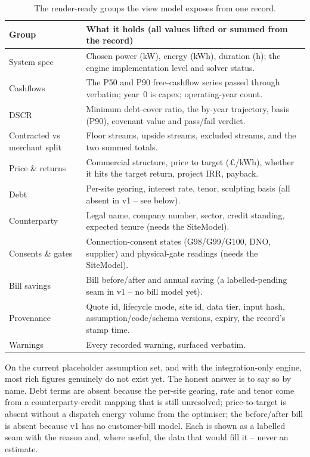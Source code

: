 \begin{table}[H]
\centering
\caption{The render-ready groups the view model exposes from one record.}
\label{tab:vm-fields}
\small\sffamily
\begin{tabularx}{\textwidth}{@{}l L@{}}
\toprule
\textbf{Group} & \textbf{What it holds (all values lifted or summed from the record)} \\
\midrule
System spec & Chosen power (kW), energy (kWh), duration (h); the engine implementation level and solver status. \\
Cashflows & The P50 and P90 free-cashflow series passed through verbatim; year~0 is capex; operating-year count. \\
DSCR & Minimum debt-cover ratio, the by-year trajectory, basis (P90), covenant value and pass/fail verdict. \\
Contracted vs merchant split & Floor streams, upside streams, excluded streams, and the two summed totals. \\
Price \& returns & Commercial structure, price to target (\(\pounds\)/kWh), whether it hits the target return, project IRR, payback. \\
Debt & Per-site gearing, interest rate, tenor, sculpting basis (all absent in v1 -- see below). \\
Counterparty & Legal name, company number, sector, credit standing, expected tenure (needs the SiteModel). \\
Consents \& gates & Connection-consent states (G98/G99/G100, DNO, supplier) and physical-gate readings (needs the SiteModel). \\
Bill savings & Bill before/after and annual saving (a labelled-pending seam in v1 -- no bill model yet). \\
Provenance & Quote id, lifecycle mode, site id, data tier, input hash, assumption/code/schema versions, expiry, the record's stamp time. \\
Warnings & Every recorded warning, surfaced verbatim. \\
\bottomrule
\end{tabularx}
\end{table}

\begin{plainnote}
On the current placeholder assumption set, and with the integration-only engine, most rich figures genuinely do not exist yet. The honest answer is to say so by name. Debt terms are absent because the per-site gearing, rate and tenor come from a counterparty-credit mapping that is still unresolved; price-to-target is absent without a dispatch energy volume from the optimiser; the before/after bill is absent because v1 has no customer-bill model. Each is shown as a labelled seam with the reason and, where useful, the data that would fill it -- never an estimate.
\end{plainnote}

